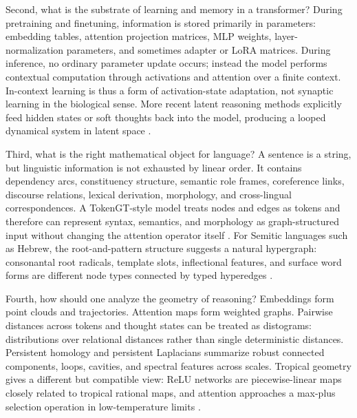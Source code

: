 \documentclass[11pt]{article}
\newcommand{\1}{\mathbf{1}}
\begin{document}
Second, what is the substrate of learning and memory in a transformer? During pretraining and finetuning, information is stored primarily in parameters: embedding tables, attention projection matrices, MLP weights, layer-normalization parameters, and sometimes adapter or LoRA matrices. During inference, no ordinary parameter update occurs; instead the model performs contextual computation through activations and attention over a finite context. In-context learning is thus a form of activation-state adaptation, not synaptic learning in the biological sense. More recent latent reasoning methods explicitly feed hidden states or soft thoughts back into the model, producing a looped dynamical system in latent space \cite{Vaswani2017,Yun2020,Ramsauer2021,Hao2024,Saunshi2025,SoftCoT2025,ZhuLatentSurvey2025,ZhuOuro2025}.

Third, what is the right mathematical object for language? A sentence is a string, but linguistic information is not exhausted by linear order. It contains dependency arcs, constituency structure, semantic role frames, coreference links, discourse relations, lexical derivation, morphology, and cross-lingual correspondences. A TokenGT-style model treats nodes and edges as tokens and therefore can represent syntax, semantics, and morphology as graph-structured input without changing the attention operator itself \cite{KimTokenGT2022}. For Semitic languages such as Hebrew, the root-and-pattern structure suggests a natural hypergraph: consonantal root radicals, template slots, inflectional features, and surface word forms are different node types connected by typed hyperedges \cite{Daya2008,Hatch2025,Samo2026}.

Fourth, how should one analyze the geometry of reasoning? Embeddings form point clouds and trajectories. Attention maps form weighted graphs. Pairwise distances across tokens and thought states can be treated as distograms: distributions over relational distances rather than single deterministic distances. Persistent homology and persistent Laplacians summarize robust connected components, loops, cavities, and spectral features across scales. Tropical geometry gives a different but compatible view: ReLU networks are piecewise-linear maps closely related to tropical rational maps, and attention approaches a max-plus selection operation in low-temperature limits \cite{ZhangTropical2018,Brandenburg2024,HashemiTropicalAttention2025,TransformerTropical2026,Chazal2016,WeiPersistentLaplacian2023,Draganov2024,TDA_NLP_Survey2025}.
\end{document}
